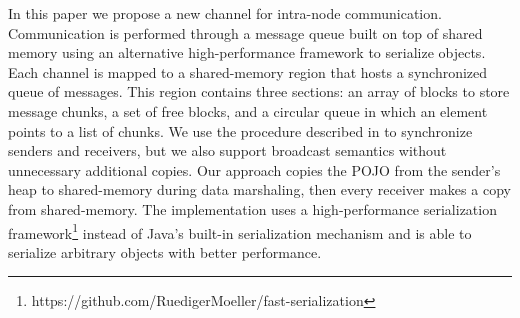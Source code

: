 In this paper we propose a new channel for intra-node communication.
Communication is performed through a message queue built on top of shared memory using an alternative high-performance framework to serialize objects.
Each channel is mapped to a shared-memory region that hosts a synchronized queue of messages.
This region contains three sections: an array of blocks to store message chunks, 
a set of free blocks, and a circular queue in which an element points to a list of chunks.
We use the procedure described in \cite{Unrau:708530} to synchronize senders and receivers, but we also support broadcast semantics without unnecessary additional copies.
Our approach copies the POJO from the sender's heap to shared-memory during data marshaling, then every receiver makes a copy from shared-memory.
The implementation uses a high-performance serialization framework\footnote{https://github.com/RuedigerMoeller/fast-serialization}
instead of Java's built-in serialization mechanism
and is able to serialize arbitrary objects with better performance.

